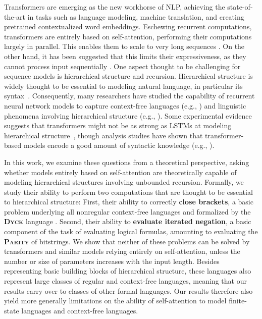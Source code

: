 \documentclass[11pt,a4paper]{article}
\newcommand{\key}[1]{\textbf{#1}}
\begin{document}
Transformers are emerging as the new workhorse of NLP, achieving the state-of-the-art in tasks such as language modeling, machine translation, and creating pretrained contextualized word embeddings.
Eschewing recurrent computations, transformers are entirely based on self-attention, performing their computations largely in parallel.
This enables them to scale to very long sequences \cite{vaswani2017attention,dai2019transformer,child2019generating}.
On the other hand, it has been suggested that this limits their expressiveness, as they cannot process input sequentially \cite{tran2018importance,dehghani2018universal,shen2018disan,chen2018best,hao2019modeling}.
One aspect thought to be challenging for sequence models is hierarchical structure and recursion.
Hierarchical structure is widely thought to be essential to modeling natural language, in particular its syntax~\cite{everaert2015structures}.
Consequently, many researchers have studied the capability of recurrent neural network models to capture context-free languages (e.g., \citet{kalinke1998computation,gers2001lstm,gruning2006stack,weiss2018practical,sennhauser2018evaluating,korsky2019computational}) and linguistic phenomena involving hierarchical structure (e.g., \citet{linzen2016assessing,gulordava2018colorless}).
Some experimental evidence suggests that transformers might not be as strong as LSTMs at modeling hierarchical structure~\cite{tran2018importance}, though analysis studies have shown that transformer-based models encode a good amount of syntactic knowledge (e.g., \citet{clark2019bert,lin2019open,tenney2019bert}).

In this work, we examine these questions from a theoretical perspective, asking whether models entirely based on self-attention are theoretically capable of modeling hierarchical structures involving unbounded recursion.
Formally, we study their ability to perform two computations that are thought to be essential to hierarchical structure:
First, their ability to correctly \key{close brackets}, a basic problem underlying all nonregular context-free languages and formalized by the \key{\textsc{Dyck}} language \cite{chomsky1963algebraic}.
Second, their ability to \key{evaluate iterated negation}, a basic component of the task of evaluating logical formulas, amounting to evaluating the \key{\textsc{Parity}} of bitstrings.
We show that neither of these problems can be solved by transformers and similar models relying entirely on self-attention, unless the number or size of parameters increases with the input length.
Besides representing basic building blocks of hierarchical structure, these languages also represent large classes of regular and context-free languages, meaning that our results carry over to classes of other formal languages.
Our results therefore also yield more generally limitations on the ability of self-attention to model finite-state languages and context-free languages.
\end{document}
